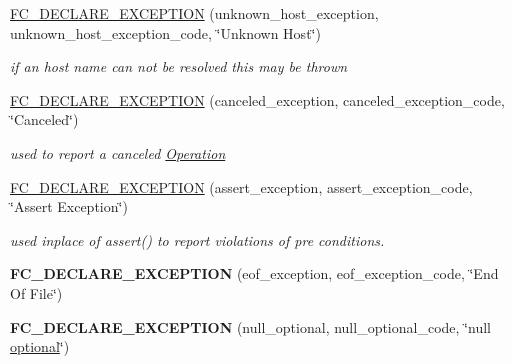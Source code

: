 \begin{DoxyCompactItemize}
\mbox{\label{namespacefc_a2fc4017ec771b7519ee964ade01dbc3d}} 
\mbox{\hyperlink{namespacefc_a2fc4017ec771b7519ee964ade01dbc3d}{F\+C\+\_\+\+D\+E\+C\+L\+A\+R\+E\+\_\+\+E\+X\+C\+E\+P\+T\+I\+ON}} (unknown\+\_\+host\+\_\+exception, unknown\+\_\+host\+\_\+exception\+\_\+code, \char`\"{}Unknown Host\char`\"{})
\begin{DoxyCompactList}\small\item\em if an host name can not be resolved this may be thrown \end{DoxyCompactList}\item 
\mbox{\label{namespacefc_af312996148d82e3961a42b246b6847e0}} 
\mbox{\hyperlink{namespacefc_af312996148d82e3961a42b246b6847e0}{F\+C\+\_\+\+D\+E\+C\+L\+A\+R\+E\+\_\+\+E\+X\+C\+E\+P\+T\+I\+ON}} (canceled\+\_\+exception, canceled\+\_\+exception\+\_\+code, \char`\"{}Canceled\char`\"{})
\begin{DoxyCompactList}\small\item\em used to report a canceled \mbox{\hyperlink{struct_operation}{Operation}} \end{DoxyCompactList}\item 
\mbox{\label{namespacefc_ab26f4a2e020010a65363829a0ad91b97}} 
\mbox{\hyperlink{namespacefc_ab26f4a2e020010a65363829a0ad91b97}{F\+C\+\_\+\+D\+E\+C\+L\+A\+R\+E\+\_\+\+E\+X\+C\+E\+P\+T\+I\+ON}} (assert\+\_\+exception, assert\+\_\+exception\+\_\+code, \char`\"{}Assert Exception\char`\"{})
\begin{DoxyCompactList}\small\item\em used inplace of assert() to report violations of pre conditions. \end{DoxyCompactList}\item 
\mbox{\label{namespacefc_a1c305e6ffe96fd396f50ab104af6e991}} 
{\bfseries F\+C\+\_\+\+D\+E\+C\+L\+A\+R\+E\+\_\+\+E\+X\+C\+E\+P\+T\+I\+ON} (eof\+\_\+exception, eof\+\_\+exception\+\_\+code, \char`\"{}End Of File\char`\"{})
\item 
\mbox{\label{namespacefc_a62b41ad6ddc4902b1b4aac336c224cf5}} 
{\bfseries F\+C\+\_\+\+D\+E\+C\+L\+A\+R\+E\+\_\+\+E\+X\+C\+E\+P\+T\+I\+ON} (null\+\_\+optional, null\+\_\+optional\+\_\+code, \char`\"{}null \mbox{\hyperlink{classfc_1_1optional}{optional}}\char`\"{})
\item 

\end{DoxyCompactItemize}
